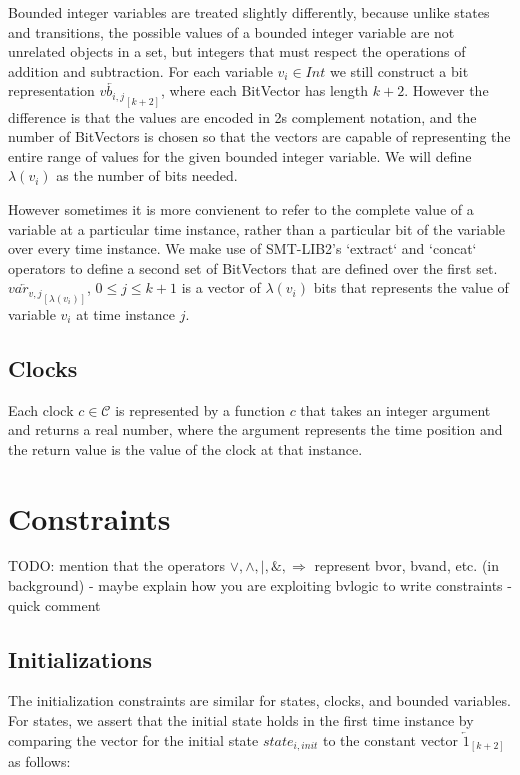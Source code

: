 \documentclass[a4paper,11pt]{article}
\begin{document}
Bounded integer variables are treated slightly differently, because unlike
states and transitions, the possible values of a bounded integer variable are
not unrelated objects in a set, but integers that must respect the operations of
addition and subtraction. For each variable \(v_i \in Int\) we still construct a
bit representation \(\overleftarrow{vb_{i,j}}_{[k+2]}\), where each BitVector
has length \(k+2\). However the difference is that the values are encoded in 2s
complement notation, and the number of BitVectors is chosen so that the vectors
are capable of representing the entire range of values for the given bounded
integer variable. We will define \(\lambda(v_i)\) as the number of bits needed.

However sometimes it is more convienent to refer to the complete value of a
variable at a particular time instance, rather than a particular bit of the
variable over every time instance. We make use of SMT-LIB2's `extract` and
`concat` operators to define a second set of BitVectors that are defined over
the first set. \(\overleftarrow{var_{v,j}}_{[\lambda(v_i)]}\), \(0 \leq j \leq
k+1\) is a vector of \(\lambda(v_i)\) bits that represents the value of variable
\(v_i\) at time instance \(j\).


\subsection{Clocks}
\label{sec:orgb2d3efd}

Each clock \(c \in \mathcal{C}\) is represented by a function \(c\) that takes
an integer argument and returns a real number, where the argument represents the
time position and the return value is the value of the clock at that instance.

\section{Constraints}
\label{sec:orgb4e4eb6}
TODO: mention that the operators \(\lor, \land, | , \&, \Rightarrow\) represent
bvor, bvand, etc. (in background) -  maybe explain how you are exploiting bvlogic to write constraints - quick comment
\subsection{Initializations}
\label{sec:orgccf91c0}

The initialization constraints are similar for states, clocks, and bounded
variables. For states, we assert that the initial state holds in the first time
instance by comparing the vector for the initial state \(state_{i,init}\) to the
constant vector \(\overleftarrow{1}_{[k+2]}\) as follows:
\end{document}
